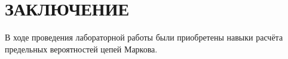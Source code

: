 \section*{ЗАКЛЮЧЕНИЕ}

В ходе проведения лабораторной работы были приобретены навыки расчёта предельных
вероятностей цепей Маркова.

\newpage
